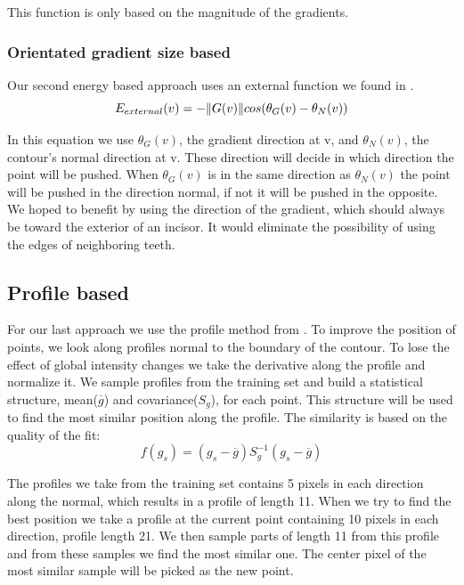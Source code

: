 \documentclass[a4paper,10pt]{article}
\begin{document}
This function is only based on the magnitude of the gradients.

\subsubsection{Orientated gradient size based}
Our second energy based approach uses an external function we found in \cite{OrientatedEnergy}. 
\begin{equation}
E_{external}(v) = -  \|G(v)\|cos(\theta_{G}(v) - \theta_{N}(v))\\
\end{equation}

In this equation we use $\theta_{G}(v)$, the gradient direction at v, and $\theta_{N}(v)$, the contour's normal direction at v. These direction will decide in which direction the point will be pushed. When $\theta_{G}(v)$ is in the same direction as  $\theta_{N}(v)$ the point will be pushed in the direction normal, if not it will be pushed in the opposite. We hoped to benefit by using the direction of the gradient, which should always be toward the exterior of an incisor. It would eliminate the possibility of using the edges of neighboring teeth.

\subsection{Profile based}\label{sec:fit_deriv}
For our last approach we use the profile method from \cite{TemplateAlgorithm}. To improve the position of points, we look along profiles normal to the boundary of the contour. To lose the effect of global intensity changes we take the derivative along the profile and normalize it. We sample profiles from the training set and build a statistical structure, mean($\overline{g}$) and covariance($S_{g}$), for each point. This structure will be used to find the most similar position along the profile. The similarity is based on the quality of the fit:
\begin{equation}
f(g_{s}) = (g_{s} - \overline{g}) S_{g}^{-1} (g_{s}-\overline{g})
\end{equation}

The profiles we take from the training set contains 5 pixels in each direction along the normal, which results in a profile of length 11. When we try to find the best position we take a profile at the current point containing 10 pixels in each direction, profile length 21. We then sample parts of length 11 from this profile and from these samples we find the most similar one. The center pixel of the most similar sample will be picked as the new point.
\end{document}
